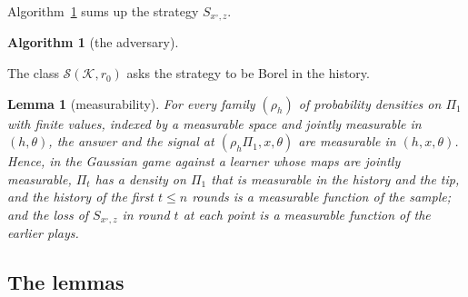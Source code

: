 \documentclass[11pt]{amsart}
\newtheorem{lemma}[theorem]{Lemma}
\theoremstyle{definition}
\newtheorem{algorithm}[theorem]{Algorithm}
\numberwithin{equation}{section}
\newcommand{\cK}{\mathcal{K}}
\begin{document}
Algorithm~\ref{alg:adv} sums up the strategy $S_{x^\circ,z}$.

\begin{algorithm}[the adversary]\label{alg:adv}
\leavevmode
\begin{center}
\end{center}
\end{algorithm}

The class $\mathcal S(\cK,r_0)$ asks the strategy to be Borel in the history.

\begin{lemma}[measurability]\label{lem:meas}
For every family $(\rho_h)$ of probability densities on $\Pi_1$ with finite values, indexed by a measurable space and jointly measurable in $(h,\theta)$, the answer and the signal at $(\rho_h\Pi_1,x,\theta)$ are measurable in $(h,x,\theta)$. Hence, in the Gaussian game against a learner whose maps are jointly measurable, $\Pi_t$ has a density on $\Pi_1$ that is measurable in the history and the tip, and the history of the first $t\le n$ rounds is a measurable function of the sample; and the loss of $S_{x^\circ,z}$ in round $t$ at each point is a measurable function of the earlier plays.
\end{lemma}

\subsection{The lemmas}\label{sec:lower-lemmas}
\end{document}
